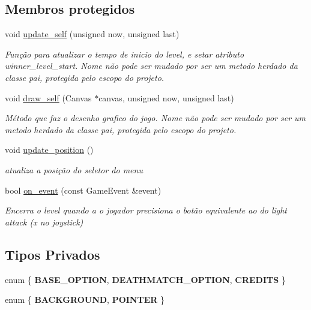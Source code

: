 \subsection*{Membros protegidos}
\begin{DoxyCompactItemize}
\item 
void \mbox{\hyperlink{classMenuLevel_ab84aecb253d1d83b827be0eaf08a3e22}{update\+\_\+self}} (unsigned now, unsigned last)
\begin{DoxyCompactList}\small\item\em Função para atualizar o tempo de inicio do level, e setar atributo winner\+\_\+level\+\_\+start. Nome não pode ser mudado por ser um metodo herdado da classe pai, protegida pelo escopo do projeto. \end{DoxyCompactList}\item 
void \mbox{\hyperlink{classMenuLevel_a62ac78a0d9ddbe89ef41b9c13f8db99f}{draw\+\_\+self}} (Canvas $\ast$canvas, unsigned now, unsigned last)
\begin{DoxyCompactList}\small\item\em Método que faz o desenho grafico do jogo. Nome não pode ser mudado por ser um metodo herdado da classe pai, protegida pelo escopo do projeto. \end{DoxyCompactList}\item 
void \mbox{\hyperlink{classMenuLevel_abdc07d5fc61e4767f81c56b1198e848e}{update\+\_\+position}} ()
\begin{DoxyCompactList}\small\item\em atualiza a posição do seletor do menu \end{DoxyCompactList}\item 
bool \mbox{\hyperlink{classMenuLevel_a8d450674d7c3678c7ff1f146b3e63be1}{on\+\_\+event}} (const Game\+Event \&event)
\begin{DoxyCompactList}\small\item\em Encerra o level quando a o jogador precisiona o botão equivalente ao do light attack (x no joystick) \end{DoxyCompactList}\end{DoxyCompactItemize}
\subsection*{Tipos Privados}
\begin{DoxyCompactItemize}
\item 
\mbox{\label{classMenuLevel_a46a07b197f64d30cf020bc58dcb7e50e}} 
enum \{ {\bfseries B\+A\+S\+E\+\_\+\+O\+P\+T\+I\+ON}, 
{\bfseries D\+E\+A\+T\+H\+M\+A\+T\+C\+H\+\_\+\+O\+P\+T\+I\+ON}, 
{\bfseries C\+R\+E\+D\+I\+TS}
 \}
\item 
\mbox{\label{classMenuLevel_a6ef5f03132bd0d1a7ceb34f800b1d62e}} 
enum \{ {\bfseries B\+A\+C\+K\+G\+R\+O\+U\+ND}, 
{\bfseries P\+O\+I\+N\+T\+ER}
 \}
\end{DoxyCompactItemize}
